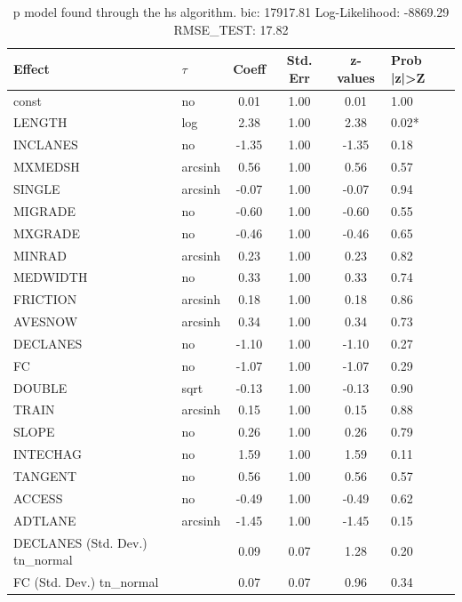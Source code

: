 \begin{table}
	\caption{p model found through the hs algorithm. bic: 17917.81 Log-Likelihood: -8869.29 RMSE_TEST: 17.82}
	\begin{center}
		\begin{tabular}{|l|l|c|c|c|l|}
			\hline
			Effect & $\tau$ & Coeff & Std. Err & z-values & Prob |z|>Z \\
			\hline
			const & no & 0.01 & 1.00 & 0.01 & 1.00 \\
			\hline
			LENGTH & log & 2.38 & 1.00 & 2.38 & 0.02* \\
			\hline
			INCLANES & no & -1.35 & 1.00 & -1.35 & 0.18 \\
			\hline
			MXMEDSH & arcsinh & 0.56 & 1.00 & 0.56 & 0.57 \\
			\hline
			SINGLE & arcsinh & -0.07 & 1.00 & -0.07 & 0.94 \\
			\hline
			MIGRADE & no & -0.60 & 1.00 & -0.60 & 0.55 \\
			\hline
			MXGRADE & no & -0.46 & 1.00 & -0.46 & 0.65 \\
			\hline
			MINRAD & arcsinh & 0.23 & 1.00 & 0.23 & 0.82 \\
			\hline
			MEDWIDTH & no & 0.33 & 1.00 & 0.33 & 0.74 \\
			\hline
			FRICTION & arcsinh & 0.18 & 1.00 & 0.18 & 0.86 \\
			\hline
			AVESNOW & arcsinh & 0.34 & 1.00 & 0.34 & 0.73 \\
			\hline
			DECLANES & no & -1.10 & 1.00 & -1.10 & 0.27 \\
			\hline
			FC & no & -1.07 & 1.00 & -1.07 & 0.29 \\
			\hline
			DOUBLE & sqrt & -0.13 & 1.00 & -0.13 & 0.90 \\
			\hline
			TRAIN & arcsinh & 0.15 & 1.00 & 0.15 & 0.88 \\
			\hline
			SLOPE & no & 0.26 & 1.00 & 0.26 & 0.79 \\
			\hline
			INTECHAG & no & 1.59 & 1.00 & 1.59 & 0.11 \\
			\hline
			TANGENT & no & 0.56 & 1.00 & 0.56 & 0.57 \\
			\hline
			ACCESS & no & -0.49 & 1.00 & -0.49 & 0.62 \\
			\hline
			ADTLANE & arcsinh & -1.45 & 1.00 & -1.45 & 0.15 \\
			\hline
			DECLANES (Std. Dev.) tn_normal &  & 0.09 & 0.07 & 1.28 & 0.20 \\
			\hline
			FC (Std. Dev.) tn_normal &  & 0.07 & 0.07 & 0.96 & 0.34 \\

\end{tabular}
\end{center}
\end{table}
